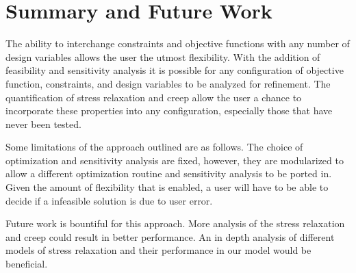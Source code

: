 \documentclass[10pt]{article}
\begin{document}
\section{Summary and Future Work}
The ability to interchange constraints and objective functions with any number of design variables allows the user the utmost flexibility. With the addition of feasibility and sensitivity analysis it is possible for any configuration of objective function, constraints, and design variables to be analyzed for refinement. The quantification of stress relaxation and creep allow the user a chance to incorporate these properties into any configuration, especially those that have never been tested. 

Some limitations of the approach outlined are as follows. The choice of optimization and sensitivity analysis are fixed, however, they are modularized to allow a different optimization routine and sensitivity analysis to be ported in. Given the amount of flexibility that is enabled, a user will have to be able to decide if a infeasible solution is due to user error. 

Future work is bountiful for this approach. More analysis of the stress relaxation and creep could result in better performance. An in depth analysis of different models of stress relaxation and their performance in our model would be beneficial. 



\vfill\pagebreak

	
	


\end{document}
